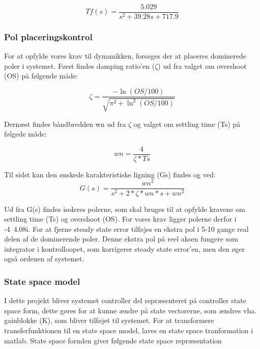 \begin{equation}
Tf(s) = \frac{5.029}{s^2 + 39.28 s + 717.9}
\end{equation}

\subsubsection{Pol placeringskontrol}
For at opfylde vores krav til dynamikken, forsøges der at placeres dominerede poler i systemet. Først findes damping ratio'en ($ \zeta $) ud fra valget om overshoot (OS) på følgende måde: 

\begin{equation}
\zeta = \frac{-\ln(OS/100)}{\sqrt{\pi^2+\ln^2(OS/100)}}
\end{equation} 

Dernæst findes båndbredden wn ud fra $ \zeta $ og valget om settling time (Ts) på følgede måde:

\begin{equation}
wn = \frac{4}{\zeta*Ts}
\end{equation} 

Til sidst kan den ønskede karakteristiske ligning (Gs) findes og ved:
\begin{equation}
G(s) = \frac{wn^2}{s^2+2*\zeta*wn*s+wn^2}
\end{equation}

Ud fra G(s) findes isoleres polerne, som skal bruges til at opfylde kravene om settling time (Ts) og overshoot (OS). For vores krav ligger polerne  derfor i -4\textpm\ 4.08i. For at fjerne steady state error tilføjes en ekstra pol i 5-10 gange real delen af de dominerende poler. Denne ekstra pol på reel aksen fungere som integrator i kontrolloopet, som korrigerer steady state error'en, men den øger også ordenen af systemet.


\subsubsection{State space model}

I dette projekt bliver systemet controller del repræsenteret på controller state space form, dette gøres for at kunne ændre på state vectorerne, som ændres vha. gainblokke (K), som bliver tilføjet til systemet. For at transformere transferfunktionen til en state space model, laves en state space tranformation i matlab. State space formlen giver følgende state space repræsentation

